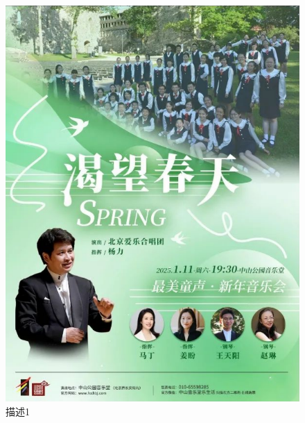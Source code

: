 \documentclass[12pt,a4paper,UTF8]{ctexart}
\begin{document}
\begin{figure}[!htbp]
    \centering
    \begin{minipage}{0.45\textwidth}
        \centering
        \includegraphics[width=\textwidth]{figures/ex.png}
        \caption{描述1}
        \label{I3}
    \end{minipage}
    \hfill %
    \begin{minipage}{0.45\textwidth}
        \centering

\end{minipage}
\end{figure}
\end{document}
